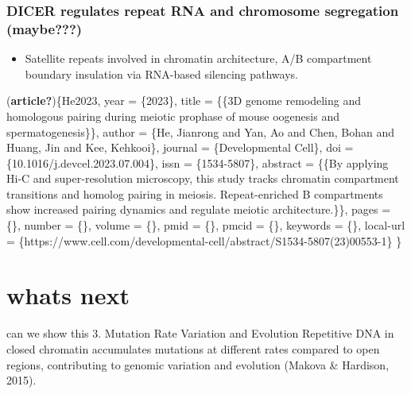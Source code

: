 \documentclass[
  a4paper,
]{scrbook}
\providecommand{\tightlist}{%
  \setlength{\itemsep}{0pt}\setlength{\parskip}{0pt}}
\begin{document}
\subsection{DICER regulates repeat RNA and chromosome segregation
(maybe???)}\label{dicer-regulates-repeat-rna-and-chromosome-segregation-maybe}

\begin{itemize}
\tightlist
\item
  Satellite repeats involved in chromatin architecture, A/B compartment
  boundary insulation via RNA-based silencing pathways.
\end{itemize}

(\textbf{article?})\{He2023, year = \{2023\}, title = \{\{3D genome
remodeling and homologous pairing during meiotic prophase of mouse
oogenesis and spermatogenesis\}\}, author = \{He, Jianrong and Yan, Ao
and Chen, Bohan and Huang, Jin and Kee, Kehkooi\}, journal =
\{Developmental Cell\}, doi = \{10.1016/j.devcel.2023.07.004\}, issn =
\{1534-5807\}, abstract = \{\{By applying Hi-C and super-resolution
microscopy, this study tracks chromatin compartment transitions and
homolog pairing in meiosis. Repeat-enriched B compartments show
increased pairing dynamics and regulate meiotic architecture.\}\}, pages
= \{\}, number = \{\}, volume = \{\}, pmid = \{\}, pmcid = \{\},
keywords = \{\}, local-url =
\{https://www.cell.com/developmental-cell/abstract/S1534-5807(23)00553-1\}
\}

\chapter{whats next}\label{whats-next}

can we show this 3. Mutation Rate Variation and Evolution Repetitive DNA
in closed chromatin accumulates mutations at different rates compared to
open regions, contributing to genomic variation and evolution (Makova \&
Hardison, 2015).

\begin{figure}


\caption{\label{fig-fig_1_kantorovitz}}

\end{figure}%
\end{document}
